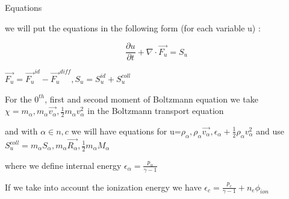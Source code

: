 \documentclass{beamer}
\begin{document}
\begin{frame}{Equations}

we will put the equations in the following form (for each variable u) :

\begin{equation}
\frac{\partial u}{\partial t} + \nabla \cdot \vec{F_u} = S_u
\end{equation}

$\vec{F_u} = \vec{F_u}^{id} - \vec{F_u}^{diff}, S_u = S_u^{id} + S_u^{coll} $

For the $0^{th}$, first and second moment of Boltzmann equation we take $\chi=m_{\alpha}, m_{\alpha} \vec{v_\alpha}, \frac{1}{2} m_\alpha v_\alpha^2 $ in the Boltzmann transport equation

and with $\alpha \in n,c$ we will have equations for u=$\rho_\alpha,\rho_\alpha \vec{v_\alpha},\epsilon_\alpha + \frac{1}{2}\rho_\alpha v_\alpha^2 $ and use $S_u^{coll}=m_\alpha S_\alpha,m_\alpha \vec{R_\alpha}, 
\frac{1}{2}m_\alpha M_\alpha$ 

where we define internal energy $\epsilon_\alpha = \frac{p_\alpha}{\gamma - 1} $ 

If we  take into account the ionization energy  we have $\epsilon_c = \frac{p_c}{\gamma - 1} + n_e \phi_{ion}$

\end{frame}
\end{document}
